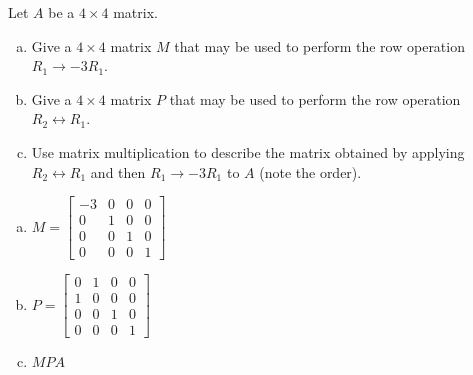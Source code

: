
\begin{exerciseStatement}


Let \(A\) be a \(4 \times 4\) matrix.


\begin{enumerate}[(a)]
\item Give a \(4 \times 4\) matrix \(M\) that may be used to perform the row operation \( R_1 \to -3R_1 \).
\item Give a \(4 \times 4\) matrix \(P\) that may be used to perform the row operation \( R_2 \leftrightarrow R_1 \).
\item Use matrix multiplication to describe the matrix obtained by applying \( R_2 \leftrightarrow R_1 \) and then \( R_1 \to -3R_1 \) to \(A\) (note the order). 
\end{enumerate}
    
\end{exerciseStatement}
    
\begin{exerciseAnswer} 

\begin{enumerate}[(a)]
\item \(M= \left[\begin{array}{cccc}
-3 & 0 & 0 & 0 \\
0 & 1 & 0 & 0 \\
0 & 0 & 1 & 0 \\
0 & 0 & 0 & 1
\end{array}\right] \)
\item \(P= \left[\begin{array}{cccc}
0 & 1 & 0 & 0 \\
1 & 0 & 0 & 0 \\
0 & 0 & 1 & 0 \\
0 & 0 & 0 & 1
\end{array}\right] \)
\item \(MPA\)
\end{enumerate}
    
\end{exerciseAnswer}
    
